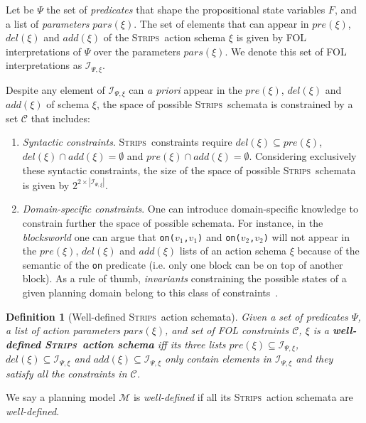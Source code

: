 \documentclass{article}
\newcommand{\strips}{\textsc{Strips}}
\newtheorem{definition}[theorem]{Definition}
\begin{document}
Let be $\Psi$ the set of {\em predicates} that shape the propositional state variables $F$, and a list of {\em parameters} $pars(\xi)$. The set of elements that can appear in $pre(\xi)$, $del(\xi)$ and $add(\xi)$ of the \strips\ action schema $\xi$ is given by FOL interpretations of $\Psi$ over the parameters $pars(\xi)$. We denote this set of FOL interpretations as ${\mathcal I}_{\Psi,\xi}$. 

Despite any element of ${\mathcal I}_{\Psi,\xi}$ can {\em a priori} appear in the $pre(\xi)$, $del(\xi)$ and $add(\xi)$ of schema $\xi$, the space of possible \strips\ schemata is constrained by a set ${\mathcal C}$ that includes:

\begin{enumerate}
\item {\em Syntactic constraints}. \strips\ constraints require $del(\xi)\subseteq pre(\xi)$, $del(\xi)\cap add(\xi)=\emptyset$ and $pre(\xi)\cap add(\xi)=\emptyset$. Considering exclusively these syntactic constraints, the size of the space of possible \strips\ schemata is given by $2^{2\times|{\mathcal I}_{\Psi,\xi}|}$. 

\item {\em Domain-specific constraints}. One can introduce domain-specific knowledge to constrain further the space of possible schemata. For instance, in the {\em blocksworld} one can argue that {\small\tt on($v_1$,$v_1$)} and {\small\tt on($v_2$,$v_2$)} will not appear in the $pre(\xi)$, $del(\xi)$ and $add(\xi)$ lists of an action schema $\xi$ because of the semantic of the {\tt\small on} predicate (i.e. only one block can be on top of another block). As a rule of thumb, {\it invariants} constraining the possible states of a given planning domain belong to this class of constraints~\cite{fox1998automatic}. 
\end{enumerate}

\begin{definition}[Well-defined \strips\ action schemata]
Given a set of {\em predicates} $\Psi$, a list of action {\em parameters} $pars(\xi)$, and set of FOL constraints ${\mathcal C}$, $\xi$ is a {\bf well-defined \strips\ action schema} iff its three lists $pre(\xi)\subseteq {\mathcal I}_{\Psi,\xi}$, $del(\xi)\subseteq{\mathcal I}_{\Psi,\xi}$ and $add(\xi)\subseteq{\mathcal I}_{\Psi,\xi}$ only contain elements in ${\mathcal I}_{\Psi,\xi}$ and they satisfy all the constraints in ${\mathcal C}$.
\end{definition}

We say a planning model $\mathcal{M}$ is {\em well-defined} if all its \strips\ action schemata are {\em well-defined}.
\end{document}
